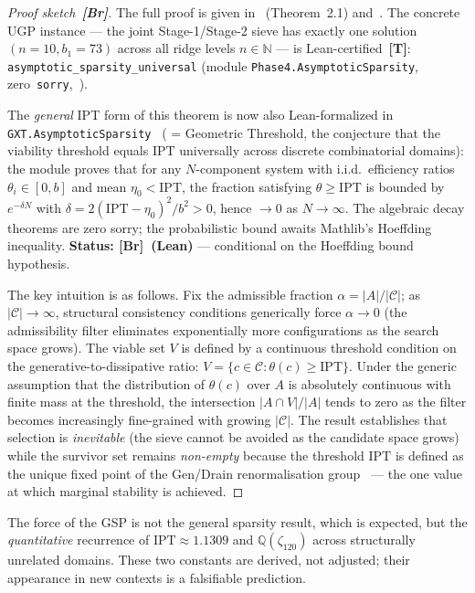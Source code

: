 \documentclass[11pt]{article}
\theoremstyle{remark}
\newcommand{\IPT}{\mathrm{IPT}}
\newcommand{\GXT}{\text{GXT}}
\newcommand{\zetaN}[1]{\zeta_{#1}}
\newcommand{\lean}[1]{\texttt{#1}}
\begin{document}
\begin{proof}[Proof sketch~\textbf{[Br]}]
The full proof is given in~\cite{Spivack2026_SM_UGP} (Theorem~2.1) and~\cite{SpivackUGP}.
The concrete UGP instance --- the joint Stage-1/Stage-2 sieve has exactly one
solution $(n=10, b_1=73)$ across all ridge levels $n\in\mathbb{N}$ ---
is Lean-certified~\textbf{[T]}: \lean{asymptotic\_sparsity\_universal}
(module \lean{Phase4.AsymptoticSparsity}, zero~\lean{sorry},~\cite{ugp-lean}).

{\sloppy The \emph{general} IPT form of this theorem is now also Lean-formalized in
\lean{GXT.AsymptoticSparsity}~\cite{ugp-lean}
(\GXT{} = Geometric Threshold, the conjecture that the viability threshold equals $\IPT$
universally across discrete combinatorial domains):
the module proves that for any $N$-component system with i.i.d.\ efficiency
ratios $\theta_i \in [0,b]$ and mean $\eta_0 < \IPT$, the fraction satisfying
$\theta \geq \IPT$ is bounded by $e^{-\delta N}$ with
$\delta = 2(\IPT - \eta_0)^2/b^2 > 0$, hence $\to 0$ as $N \to \infty$.
The algebraic decay theorems are zero sorry; the probabilistic bound
awaits Mathlib's Hoeffding inequality.
\textbf{Status: [Br]~(Lean)} --- conditional on the Hoeffding bound hypothesis.\par}

The key intuition is as follows.
Fix the admissible fraction $\alpha = |A|/|\mathcal{C}|$; as $|\mathcal{C}| \to \infty$,
structural consistency conditions generically force $\alpha \to 0$ (the
admissibility filter eliminates exponentially more configurations as the
search space grows).
The viable set $V$ is defined by a continuous threshold condition on the
generative-to-dissipative ratio: $V = \{c \in \mathcal{C} : \theta(c) \geq \IPT\}$.
Under the generic assumption that the distribution of $\theta(c)$ over $A$ is
absolutely continuous with finite mass at the threshold, the intersection
$|A \cap V|/|A|$ tends to zero as the filter becomes increasingly fine-grained
with growing $|\mathcal{C}|$.
The result establishes that selection is \emph{inevitable} (the sieve cannot be
avoided as the candidate space grows) while the survivor set remains
\emph{non-empty} because the threshold $\IPT$ is defined as the unique fixed
point of the Gen/Drain renormalisation group~\cite{SpivackIPT} --- the one
value at which marginal stability is achieved.
\end{proof}

The force of the GSP is not the general sparsity result, which is expected, but the
\emph{quantitative} recurrence of $\IPT \approx 1.1309$ and $\mathbb{Q}(\zetaN{120})$ across
structurally unrelated domains.
These two constants are derived, not adjusted; their appearance in new contexts
is a falsifiable prediction.
\end{document}
